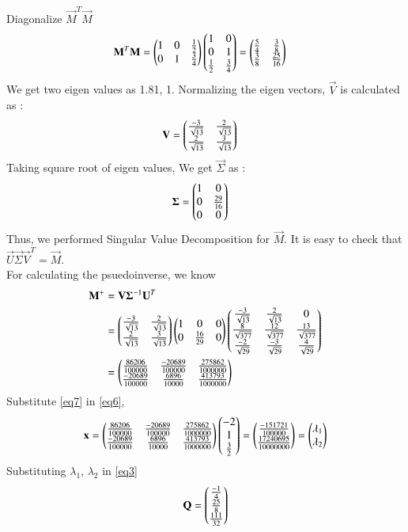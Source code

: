 \documentclass[journal,12pt,twocolumn]{IEEEtran}
\begin{document}
Diagonalize $\vec{M}^T\vec{M}$
\begin{align}
	\label{e14}\mathbf{M}^T\mathbf{M} &= \begin{pmatrix}1 & 0 & \frac{1}{2}\\0 & 1 & \frac{3}{4}\end{pmatrix}\begin{pmatrix}1 & 0\\0 & 1\\\frac{1}{2} & \frac{3}{4}\end{pmatrix} = \begin{pmatrix}\frac{5}{4} & \frac{3}{8}\\\frac{3}{8} & \frac{25}{16}\end{pmatrix}
\end{align}
We get two eigen values as 1.81, 1. Normalizing the eigen vectors, $\vec{V}$ is calculated as : 
\begin{align}
	\mathbf{V} &= \begin{pmatrix}\frac{-3}{\sqrt{13}} & \frac{2}{\sqrt{13}} \\
	\frac{2}{\sqrt{13}} & \frac{3}{\sqrt{13}}\end{pmatrix}  
\end{align}
Taking square root of eigen values, We get $\vec{\Sigma}$ as :
\begin{align}
	\mathbf{\Sigma} &= \begin{pmatrix}1 & 0\\0 & \frac{29}{16}\\0 & 0\end{pmatrix}
\end{align}
Thus, we performed Singular Value Decomposition for $\vec{M}$. It is easy to check that $\vec{U}\vec{\Sigma}\vec{V}^T = \vec{M}$. \\
For calculating the psuedoinverse, we know 
\begin{align}
\mathbf{M}^{+} &= \mathbf{V}\mathbf{\Sigma}^{-1}\mathbf{U}^T \\
&= \begin{pmatrix}\frac{-3}{\sqrt{13}} & \frac{2}{\sqrt{13}} \\
	\frac{2}{\sqrt{13}} & \frac{3}{\sqrt{13}}\end{pmatrix} \begin{pmatrix}1 & 0 & 0 \\ 0 & \frac{16}{29} & 0\end{pmatrix} \begin{pmatrix}\frac{-3}{\sqrt{13}} & \frac{2}{\sqrt{13}} & 0 \\ \frac{8}{\sqrt{377}} & \frac{12}{\sqrt{377}} &  \frac{13}{\sqrt{377}} \\  \frac{-2}{\sqrt{29}} & \frac{-3}{\sqrt{29}} & \frac{4}{\sqrt{29}}\end{pmatrix}\\
&= \label{eq7}\begin{pmatrix}\frac{86206}{100000} & \frac{-20689}{100000} & \frac{275862}{1000000} \\ \frac{-20689}{100000} & \frac{6896}{10000} & \frac{413793}{1000000}\end{pmatrix}
\end{align}
Substitute \eqref{eq7} in \eqref{eq6},
\begin{align}
	\mathbf{x} =\label{eq7}\begin{pmatrix}\frac{86206}{100000} & \frac{-20689}{100000} & \frac{275862}{1000000} \\ \frac{-20689}{100000} & \frac{6896}{10000} & \frac{413793}{1000000}\end{pmatrix}\begin{pmatrix}-2\\1\\\frac{3}{2}\end{pmatrix} = \begin{pmatrix}\frac{-151721}{100000}\\\frac{17240695}{10000000}\end{pmatrix} = \begin{pmatrix}\lambda_1 \\ \lambda_2\end{pmatrix}\label{eq8}
\end{align}
Substituting $\lambda_1$, $\lambda_2$ in \eqref{eq3}
\begin{equation}
	\mathbf{Q} = \begin{pmatrix}\frac{-1}{4}\\\frac{25}{8}\\\frac{111}{32}\end{pmatrix}
\end{equation}
\end{document}
